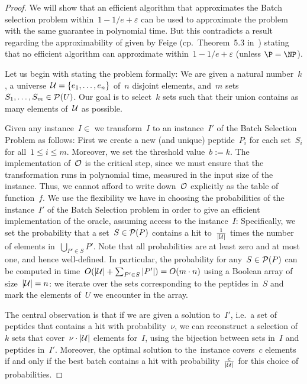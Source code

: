 \begin{proof}
We will show that an efficient algorithm that approximates the Batch selection problem within~$1 - 1/e + \varepsilon$ can be used to approximate the \maxkcover problem with the same guarantee in polynomial time. But this contradicts a result regarding the approximability of \maxkcover given by Feige (cp.\ Theorem~5.3 in~\cite{feige98}) stating that no efficient algorithm can approximate \maxkcover within~$1 - 1/e + \varepsilon$ (unless $\P = \NP$).

Let us begin with stating the \maxkcover problem formally: We are given a natural number~$k$, a universe~${\cal U} = \{e_1,\ldots,e_n\}$ of~$n$ disjoint elements, and~$m$ sets~$S_1,\ldots,S_m \in {\cal P}(U)$. Our goal is to select~$k$ sets such that their union contains as many elements of~$\cal U$ as possible.

Given any instance~$I \in$ \maxkcover we transform~$I$ to an instance~$I'$ of the Batch Selection Problem as follows: First we create a new (and unique) peptide~$P_i$ for each set~$S_i$ for all~$1 \leq i \leq m$. Moreover, we set the threshold value~$b := k$.
%
The implementation of~$\cal O$ is the critical step, since we must ensure that the transformation runs in polynomial time, measured in the input size of the \maxkcover instance. Thus, we cannot afford to write down~$\cal O$ explicitly as the table of function~$f$. We use the flexibility we have in choosing the probabilities of the instance~$I'$ of the Batch Selection problem in order to give an efficient implementation of the oracle, assuming access to the \maxkcover instance~$I$:
Specifically, we set the probability that a set~$S \in {\cal P}(P)$ contains a hit to~$\frac{1}{|\cal U|}$ times the number of elements in~$\bigcup_{P' \in S} P'$. Note that all probabilities are at least zero and at most one, and hence well-defined.
%
In particular, the probability for any~$S \in {\cal P}(P)$ can be computed in time~$O(|{\cal U}| + \sum_{P' \in S}{|P'|}) = O(m\cdot n)$ using a Boolean array of size~$|{\cal U}| = n$: we iterate over the sets corresponding to the peptides in~$S$ and mark the elements of~$U$ we encounter in the array.

The central observation is that if we are given a solution to~$I'$, i.e.\ a set of peptides that contains a hit with probability~$\nu$, we can reconstruct a selection of~$k$ sets that cover~$\nu \cdot |{\cal U}|$ elements for~$I$, using the bijection between sets in~$I$ and peptides in~$I'$.
%
Moreover, the optimal solution to the~\maxkcover instance covers~$c$ elements if and only if the best batch contains a hit with probability~$\frac{c}{|\cal U|}$ for this choice of probabilities. 


\end{proof}
